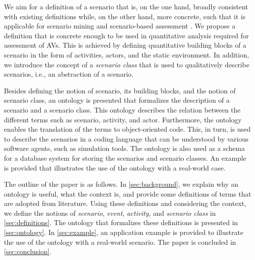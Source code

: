 We aim for a definition of a scenario that is, on the one hand, broadly consistent with existing definitions \cite{geyer2014, ulbrich2015, elrofai2016scenario} while, on the other hand, more concrete, such that it is applicable for scenario mining \cite{elrofai2016scenario} and scenario-based assessment \cite{stellet2015taxonomy, deGelder2017assessment}. We propose a definition that is concrete enough to be used in quantitative analysis required for assessment of AVs. This is achieved by defining quantitative building blocks of a scenario in the form of activities, actors, and the static environment. In addition, we introduce the concept of a \emph{scenario class} that is used to qualitatively describe scenarios, i.e., an abstraction of a scenario. 

\cbstartb
Besides defining the notion of scenario, its building blocks, and the notion of scenario class, an ontology is presented that formalizes the description of a scenario and a scenario class. 
This ontology describes the relation between the different terms such as scenario, activity, and actor.
Furthermore, the ontology enables the translation of the terms to object-oriented code.
This, in turn, is used to describe the scenarios in a coding language that can be understood by various software agents, such as simulation tools.
The ontology is also used as a schema for a database system for storing the scenarios and scenario classes.
An example is provided that illustrates the use of the ontology with a real-world case.
\cbend

The outline of the paper is as follows. In \cref{sec:background}, we explain why an ontology is useful, what the context is, and provide some definitions of terms that are adopted from literature. 
Using these definitions and considering the context, we define the notions of \emph{scenario}, \emph{event}, \emph{activity}, and \emph{scenario class} in \cref{sec:definitions}. 
The ontology that formalizes these definitions is presented in \cref{sec:ontology}. 
In \cref{sec:example}, an application example is provided to illustrate the use of the ontology with a real-world scenario. 
The paper is concluded in \cref{sec:conclusion}.
